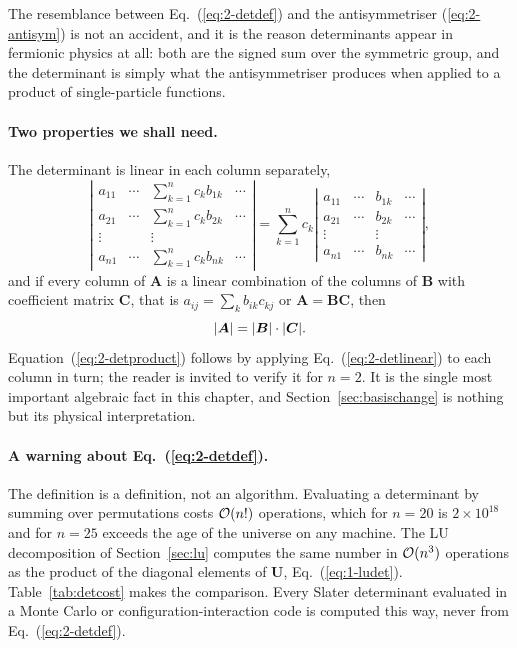 The resemblance between Eq.~(\ref{eq:2-detdef}) and the antisymmetriser
(\ref{eq:2-antisym}) is not an accident, and it is the reason determinants
appear in fermionic physics at all: both are the signed sum over the symmetric
group, and the determinant is simply what the antisymmetriser produces when
applied to a product of single-particle functions.

\paragraph{Two properties we shall need.}
The determinant is linear in each column separately,
\begin{equation}
  \left|\begin{array}{cccc}
    a_{11} & \cdots & \displaystyle\sum_{k=1}^{n}c_k b_{1k} & \cdots \\[4pt]
    a_{21} & \cdots & \displaystyle\sum_{k=1}^{n}c_k b_{2k} & \cdots \\
    \vdots & & \vdots & \\
    a_{n1} & \cdots & \displaystyle\sum_{k=1}^{n}c_k b_{nk} & \cdots
  \end{array}\right|
  =\sum_{k=1}^{n}c_k
  \left|\begin{array}{cccc}
    a_{11} & \cdots & b_{1k} & \cdots \\
    a_{21} & \cdots & b_{2k} & \cdots \\
    \vdots & & \vdots & \\
    a_{n1} & \cdots & b_{nk} & \cdots
  \end{array}\right| ,
  \label{eq:2-detlinear}
\end{equation}
and if every column of $\bm{A}$ is a linear combination of the columns of
$\bm{B}$ with coefficient matrix $\bm{C}$, that is $a_{ij}=\sum_k b_{ik}c_{kj}$
or $\bm{A}=\bm{B}\bm{C}$, then
\begin{equation}
  {|\boldsymbol{A}|} = {|\boldsymbol{B}|}\cdot{|\boldsymbol{C}|} .
  \label{eq:2-detproduct}
\end{equation}
Equation~(\ref{eq:2-detproduct}) follows by applying
Eq.~(\ref{eq:2-detlinear}) to each column in turn; the reader is invited to
verify it for $n=2$.  It is the single most important algebraic fact in this
chapter, and Section~\ref{sec:basischange} is nothing but its physical
interpretation.

\paragraph{A warning about Eq.~(\ref{eq:2-detdef}).}
The definition is a definition, not an algorithm.  Evaluating a determinant by
summing over permutations costs $\mathcal{O}(n!)$ operations, which for $n=20$ is
$2\times10^{18}$ and for $n=25$ exceeds the age of the universe on any
machine.  The LU decomposition of Section~\ref{sec:lu} computes the same
number in $\mathcal{O}(n^3)$ operations as the product of the diagonal elements of
$\bm{U}$, Eq.~(\ref{eq:1-ludet}).  Table~\ref{tab:detcost} makes the
comparison.  Every Slater determinant evaluated in a Monte Carlo or
configuration-interaction code is computed this way, never from
Eq.~(\ref{eq:2-detdef}).

